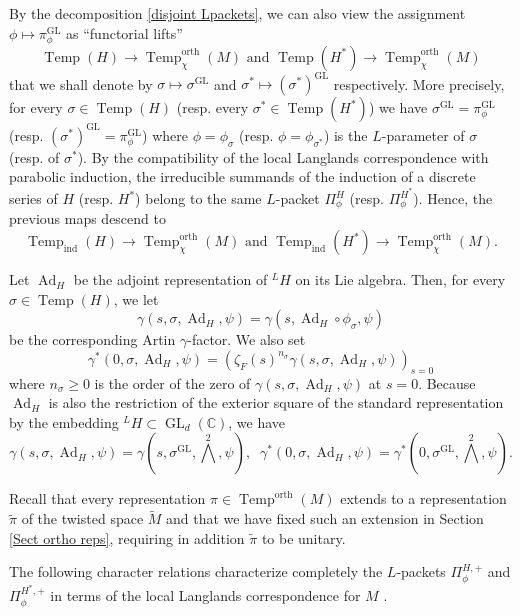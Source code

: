 \documentclass[12pt]{article}
\numberwithin{equation}{section}
\def\tM{\widetilde{M}}
\def\bC{\mathbb{C}}
\def\tpi{\widetilde{\pi}}
\DeclareMathOperator{\orth}{orth}
\DeclareMathOperator{\Temp}{Temp}
\DeclareMathOperator{\Ad}{Ad}
\DeclareMathOperator{\ind}{ind}
\DeclareMathOperator{\GL}{\mathrm{GL}}
\begin{document}
	By the decomposition \eqref{disjoint Lpackets}, we can also view the assignment $\phi\mapsto \pi^{\GL}_\phi$ as ``functorial lifts''
	$$\displaystyle \Temp(H)\to \Temp^{\orth}_\chi(M) \mbox{ and } \Temp(H^*)\to \Temp^{\orth}_\chi(M)$$
	that we shall denote by $\sigma\mapsto \sigma^{\GL}$ and $\sigma^*\mapsto (\sigma^*)^{\GL}$ respectively. More precisely, for every $\sigma\in \Temp(H)$ (resp. every $\sigma^*\in \Temp(H^*)$) we have $\sigma^{\GL}=\pi^{\GL}_{\phi}$ (resp. $(\sigma^*)^{\GL}=\pi^{\GL}_{\phi}$) where $\phi =\phi_\sigma$ (resp. $\phi=\phi_{\sigma^*}$) is the $L$-parameter of $\sigma$ (resp. of $\sigma^*$). By the compatibility of the local Langlands correspondence with parabolic induction, the irreducible summands of the induction of a discrete series of $H$ (resp. $H^*$) belong to the same $L$-packet $\Pi_\phi^H$ (resp. $\Pi^{H^*}_{\phi}$). Hence, the previous maps descend to
	$$\displaystyle \Temp_{\ind}(H)\to \Temp_\chi^{\orth}(M) \mbox{ and } \Temp_{\ind}(H^*)\to \Temp_\chi^{\orth}(M).$$
	
	Let $\Ad_H$ be the adjoint representation of ${}^L H$ on its Lie algebra. Then, for every $\sigma\in \Temp(H)$, we let
	$$\displaystyle \gamma(s,\sigma,\Ad_H,\psi)=\gamma(s,\Ad_H\circ \phi_\sigma,\psi)$$
	be the corresponding Artin $\gamma$-factor. We also set
	$$\displaystyle  \gamma^*(0,\sigma,\Ad_H,\psi)=\left(\zeta_F(s)^{n_\sigma} \gamma(s,\sigma,\Ad_H,\psi) \right)_{s=0}$$
	where $n_\sigma\geq 0$ is the order of the zero of $\gamma(s,\sigma,\Ad_H,\psi)$ at $s=0$. Because $\Ad_H$ is also the restriction of the exterior square of the standard representation by the embedding ${}^L H\subset \GL_d(\bC)$, we have
	\begin{equation}\label{eq gamma factors}
	\displaystyle \gamma(s,\sigma,\Ad_H,\psi)=\gamma(s,\sigma^{\GL},\bigwedge^2,\psi),\;\; \gamma^*(0,\sigma,\Ad_H,\psi)=\gamma^*(0,\sigma^{\GL},\bigwedge^2,\psi).
	\end{equation}
	
	Recall that every representation $\pi\in \Temp^{\orth}(M)$ extends to a representation $\tpi$ of the twisted space $\tM$ and that we have fixed such an extension in Section \ref{Sect ortho reps}, requiring in addition $\tpi$ to be unitary.
	 
 The following character relations characterize completely the $L$-packets $\Pi_\phi^{H,+}$ and $\Pi_{\phi}^{H^*,+}$ in terms of the local Langlands correspondence for $M$ \cite{artbook} \cite{MoeReLLC}.
	
\end{document}
